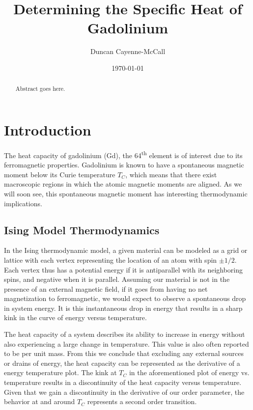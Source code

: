 \documentclass[%
reprint,
amsmath,amssymb,
aps,
]{revtex4-2}
\begin{document}
	
	
	\title{Determining the Specific Heat of Gadolinium}
	
	
	\author{Duncan Cayenne-McCall}
	
	
	\date{\today}%

	
	\begin{abstract}
		 Abstract goes here.
		
	\end{abstract}
	\maketitle
	\section{\label{sec:level1}Introduction}
	The heat capacity of gadolinium (Gd), the 64\textsuperscript{th} element is of interest due to its ferromagnetic properties. Gadolinium is known to have a spontaneous magnetic moment below its Curie temperature $T_C$, which means that there exist macroscopic regions in which the atomic magnetic moments are aligned. As we will soon see, this spontaneous magnetic moment has interesting thermodynamic implications. 
	
	\subsection{\label{sec:level2}Ising Model Thermodynamics}
	In the Ising thermodynamic model, a given material can be modeled as a grid or lattice with each vertex representing the location of an atom with spin $\pm1/2$. Each vertex thus has a potential energy if it is antiparallel with its neighboring spins\cite{UT}, and negative when it is parallel. Assuming our material is not in the presence of an external magnetic field, if it goes from having no net magnetization to ferromagnetic, we would expect to observe a spontaneous drop in system energy. It is this instantaneous drop in energy that results in a sharp kink in the curve of energy versus temperature.
	
	The heat capacity of a system describes its ability to increase in energy without also experiencing a large change in temperature. This value is also often reported to be per unit mass. From this we conclude that excluding any external sources or drains of energy, the heat capacity can be represented as the derivative of a energy temperature plot. The kink at $T_C$ in the aforementioned plot of energy vs. temperature results in a discontinuity of the heat capacity versus temperature. Given that we gain a discontinuity in the derivative of our order parameter, the behavior at and around $T_C$ represents a second order transition\cite{UT}.
	
\end{document}
